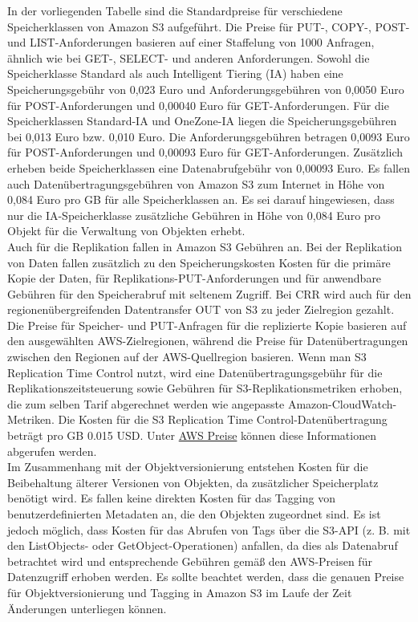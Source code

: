 In der vorliegenden Tabelle sind die Standardpreise für verschiedene Speicherklassen von Amazon S3 aufgeführt. Die Preise für PUT-, COPY-, POST- und LIST-Anforderungen basieren auf einer Staffelung von 1000 Anfragen, ähnlich wie bei GET-, SELECT- und anderen Anforderungen. Sowohl die Speicherklasse Standard als auch Intelligent Tiering (IA) haben eine Speicherungsgebühr von 0,023 Euro und Anforderungsgebühren von 0,0050 Euro für POST-Anforderungen und 0,00040 Euro für GET-Anforderungen. Für die Speicherklassen Standard-IA und OneZone-IA liegen die Speicherungsgebühren bei 0,013 Euro bzw. 0,010 Euro. Die Anforderungsgebühren betragen 0,0093 Euro für POST-Anforderungen und 0,00093 Euro für GET-Anforderungen. Zusätzlich erheben beide Speicherklassen eine Datenabrufgebühr von 0,00093 Euro. Es fallen auch Datenübertragungsgebühren von Amazon S3 zum Internet in Höhe von 0,084 Euro pro GB für alle Speicherklassen an. Es sei darauf hingewiesen, dass nur die IA-Speicherklasse zusätzliche Gebühren in Höhe von 0,084 Euro pro Objekt für die Verwaltung von Objekten erhebt.\\

Auch für die Replikation fallen in Amazon S3 Gebühren an. Bei der Replikation von Daten fallen zusätzlich zu den Speicherungskosten Kosten für die primäre Kopie der Daten, für Replikations-PUT-Anforderungen und für anwendbare Gebühren für den Speicherabruf mit seltenem Zugriff. Bei CRR wird auch für den regionenübergreifenden Datentransfer OUT von S3 zu jeder Zielregion gezahlt. Die Preise für Speicher- und PUT-Anfragen für die replizierte Kopie basieren auf den ausgewählten AWS-Zielregionen, während die Preise für Datenübertragungen zwischen den Regionen auf der AWS-Quellregion basieren. Wenn man S3 Replication Time Control nutzt, wird eine Datenübertragungsgebühr für die Replikationszeitsteuerung sowie Gebühren für S3-Replikationsmetriken erhoben, die zum selben Tarif abgerechnet werden wie angepasste Amazon-CloudWatch-Metriken. Die Kosten für die S3 Replication Time Control-Datenübertragung beträgt pro GB 0.015 USD. Unter \href{https://aws.amazon.com/de/s3/pricing/}{AWS Preise} können diese Informationen abgerufen werden.\\

Im Zusammenhang mit der Objektversionierung entstehen Kosten für die Beibehaltung älterer Versionen von Objekten, da zusätzlicher Speicherplatz benötigt wird. Es fallen keine direkten Kosten für das Tagging von benutzerdefinierten Metadaten an, die den Objekten zugeordnet sind. Es ist jedoch möglich, dass Kosten für das Abrufen von Tags über die S3-API (z. B. mit den ListObjects- oder GetObject-Operationen) anfallen, da dies als Datenabruf betrachtet wird und entsprechende Gebühren gemäß den AWS-Preisen für Datenzugriff erhoben werden. Es sollte beachtet werden, dass die genauen Preise für Objektversionierung und Tagging in Amazon S3 im Laufe der Zeit Änderungen unterliegen können.\\

